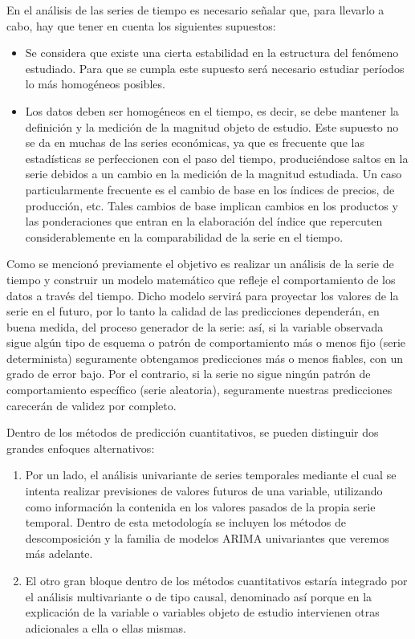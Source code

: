 \documentclass[
  a4paper,
  oneside,
  openany]{book}
\begin{document}
En el análisis de las series de tiempo es necesario señalar que, para llevarlo a cabo, hay que tener en cuenta los siguientes supuestos:

\begin{itemize}
\item
  Se considera que existe una cierta estabilidad en la estructura del fenómeno estudiado. Para que se cumpla este supuesto será necesario estudiar períodos lo más homogéneos posibles.
\item
  Los datos deben ser homogéneos en el tiempo, es decir, se debe mantener la definición y la medición de la magnitud objeto de estudio. Este supuesto no se da en muchas de las series económicas, ya que es frecuente que las estadísticas se perfeccionen con el paso del tiempo, produciéndose saltos en la serie debidos a un cambio en la medición de la magnitud estudiada. Un caso particularmente frecuente es el cambio de base en los índices de precios, de producción, etc. Tales cambios de base implican cambios en los productos y las ponderaciones que entran en la elaboración del índice que repercuten considerablemente en la comparabilidad de la serie en el tiempo.
\end{itemize}

Como se mencionó previamente el objetivo es realizar un análisis de la serie de tiempo y construir un modelo matemático que refleje el comportamiento de los datos a través del tiempo. Dicho modelo servirá para proyectar los valores de la serie en el futuro, por lo tanto la calidad de las predicciones dependerán, en buena medida, del proceso generador de la serie: así, si la variable observada sigue algún tipo de esquema o patrón de comportamiento más o menos fijo (serie determinista) seguramente obtengamos predicciones más o menos fiables, con un grado de error bajo. Por el contrario, si la serie no sigue ningún patrón de comportamiento específico (serie aleatoria), seguramente nuestras predicciones carecerán de validez por completo.

Dentro de los métodos de predicción cuantitativos, se pueden distinguir dos grandes enfoques alternativos:

\begin{enumerate}
\def\labelenumi{\arabic{enumi})}
\item
  Por un lado, el análisis univariante de series temporales mediante el cual se intenta realizar previsiones de valores futuros de una variable, utilizando como información la contenida en los valores pasados de la propia serie temporal. Dentro de esta metodología se incluyen los métodos de descomposición y la familia de modelos ARIMA univariantes que veremos más adelante.
\item
  El otro gran bloque dentro de los métodos cuantitativos estaría integrado por el análisis multivariante o de tipo causal, denominado así porque en la explicación de la variable o variables objeto de estudio intervienen otras adicionales a ella o ellas mismas.
\end{enumerate}
\end{document}
